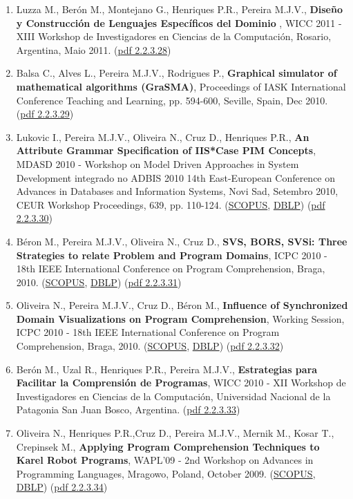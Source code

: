 \documentclass[11pt]{article}
\begin{document}
\begin{enumerate}
\item {Luzza M.,  Berón M., Montejano G., Henriques P.R., Pereira M.J.V., {\bf{ Diseño y Construcción de Lenguajes Específicos del Dominio}} , WICC 2011 - XIII Workshop de Investigadores en Ciencias de la Computación, Rosario, Argentina, Maio 2011. (\href{run:Publicacoes/publicacoes/63.pdf}{pdf 2.2.3.28})}
\item {Balsa C., Alves L., Pereira M.J.V., Rodrigues P., {\bf{ Graphical simulator of mathematical algorithms (GraSMA)}}, Proceedings of IASK International Conference Teaching and Learning, pp. 594-600, Seville, Spain, Dec 2010. (\href{run:Publicacoes/publicacoes/84.pdf}{pdf 2.2.3.29})}
\item {Lukovic I., Pereira M.J.V., Oliveira N., Cruz D., Henriques P.R., {\bf{ An Attribute Grammar Specification of IIS*Case PIM Concepts}}, MDASD 2010 - Workshop on Model Driven Approaches in System Development integrado no ADBIS 2010 14th East-European Conference on Advances in Databases and Information Systems, Novi Sad, Setembro 2010, CEUR Workshop Proceedings, 639, pp. 110-124. (\href{run:Publicacoes/PublicacoesSCOPUS.pdf}{SCOPUS}, \href{run:Publicacoes/ComprovativosDBLP.pdf}{DBLP}) (\href{run:Publicacoes/publicacoes/50.pdf}{pdf 2.2.3.30})}
\item {Béron M., Pereira M.J.V., Oliveira N., Cruz D., {\bf{ SVS, BORS, SVSi: Three Strategies to relate Problem and Program Domains}}, ICPC 2010 - 18th IEEE International Conference on Program Comprehension, Braga, 2010. (\href{run:Publicacoes/PublicacoesSCOPUS.pdf}{SCOPUS}, \href{run:Publicacoes/ComprovativosDBLP.pdf}{DBLP}) (\href{run:Publicacoes/publicacoes/53.pdf}{pdf 2.2.3.31})}
\item {Oliveira N., Pereira M.J.V., Cruz D., Béron M., {\bf{ Influence of Synchronized Domain Visualizations on Program Comprehension}}, Working Session, ICPC 2010 - 18th IEEE International Conference on Program Comprehension, Braga, 2010. (\href{run:Publicacoes/PublicacoesSCOPUS.pdf}{SCOPUS}, \href{run:Publicacoes/ComprovativosDBLP.pdf}{DBLP}) (\href{run:Publicacoes/publicacoes/54.pdf}{pdf 2.2.3.32})}
\item {Berón M., Uzal R., Henriques P.R., Pereira M.J.V., {\bf{ Estrategias para Facilitar la Comprensión de Programas}}, WICC 2010 - XII Workshop de Investigadores en Ciencias de la Computación, Universidad Nacional de la Patagonia San Juan Bosco, Argentina. (\href{run:Publicacoes/publicacoes/51.pdf}{pdf 2.2.3.33})}
\item {Oliveira N., Henriques P.R.,Cruz D., Pereira M.J.V., Mernik M., Kosar T., Crepinsek M., {\bf{ Applying Program Comprehension Techniques to Karel Robot Programs}}, WAPL'09 - 2nd Workshop on Advances in Programming Languages, Mragowo, Poland, October 2009. (\href{run:Publicacoes/PublicacoesSCOPUS.pdf}{SCOPUS}, \href{run:Publicacoes/ComprovativosDBLP.pdf}{DBLP}) (\href{run:Publicacoes/publicacoes/39.pdf}{pdf 2.2.3.34})}

\end{enumerate}
\end{document}
